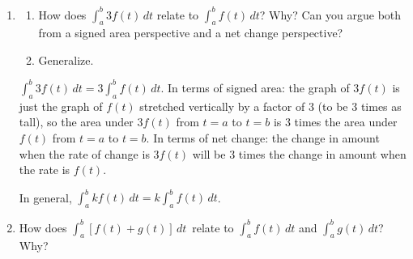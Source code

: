 \documentclass[main]{subfiles}
\begin{document}
\begin{enumerate}
\begin{enumerate}[topsep=0pt]
    \pspace{\vfill}
  \item


    \begin{problem}
    \begin{enumerate}
        \item 
        How does $\displaystyle \int_a^b 3 f(t)\,dt$ relate to
        $\displaystyle \int_a^b f(t)\,dt$?  Why? Can you argue both from
         a signed area perspective and a net change perspective?

         \item
          Generalize.
    \end{enumerate}
    \end{problem}

    \begin{solution}
      $\boxed{ \int_a^b 3 f(t)\,dt = 3 \int_a^b f(t)\,dt}$.  
      In terms of signed area: the
      graph of $3 f(t)$ is just the graph of $f(t)$ stretched vertically
      by a factor of 3 (to be 3 times as tall), so the area under $3 f(t)$
      from $t = a$ to $t = b$ is 3 times the area under $f(t)$ from $t =
      a$ to $t = b$. In terms of net change: the change in amount
      when the rate of change is $3f(t)$ will be 3 times the change in
      amount when the rate is $f(t)$.  

      In general, 
      $\boxed{\displaystyle \int_a^b kf(t)\,dt = k\int_a^b f(t)\,dt}$.
    \end{solution}

  \item


    \begin{problem}[\vfill]
      How does $\displaystyle \int_a^b \left[f(t) + g(t)\right]\,dt\,$
      relate to
      $\displaystyle \int_a^b f(t)\,dt$ and $\displaystyle \int_a^b
      g(t)\,dt$?  Why?
    \end{problem}


\end{enumerate}
\end{enumerate}
\end{document}

